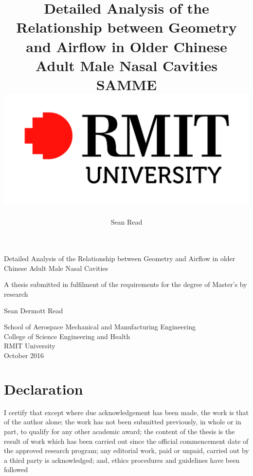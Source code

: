 \documentclass[12pt]{report}
\begin{document}
\pagestyle{title}
\title{
	{Detailed Analysis of the Relationship between Geometry and Airflow in Older Chinese Adult Male Nasal Cavities}\\
	{\large SAMME}\\
	{\includegraphics{rmit.jpg}}
}
\author{Sean Read}

    \begin{center}
        

      \vspace*{1cm}
        
	Detailed Analysis of the Relationship between Geometry and Airflow in older Chinese Adult Male Nasal Cavities
        
        \vspace*{1cm}
        A thesis submitted in fulfilment of the requirements for the degree of Master’s by research
	\vspace{1.5cm}
        
        Sean Dermott Read
        
        \vspace{2.8cm}
        

        
	School of Aerospace Mechanical and Manufacturing Engineering\\
	\vspace{0.3cm}
        College of Science Engineering and Health\\
	\vspace{0.3cm}
	RMIT University\\
	\vspace{1cm}
	October 2016
        
    \end{center}
\onehalfspacing

 
\chapter*{Declaration}
\pagestyle{style1}
I certify that except where due acknowledgement has been made, the work is that of the author alone; the work has not been submitted previously, in whole or in part, to qualify for any other academic award; the content of the thesis is the result of work which has been carried out since the official commencement date of the approved research program; any editorial work, paid or unpaid, carried out by a third party is acknowledged; and, ethics procedures and guidelines have been followed\\
\end{document}
